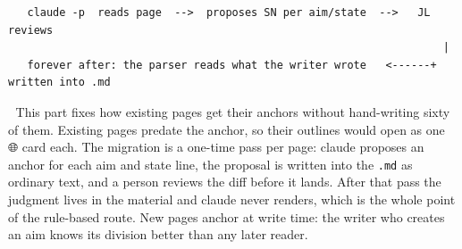 \begin{verbatim}
   claude -p  reads page  -->  proposes SN per aim/state  -->   JL reviews
                                                                    |
   forever after: the parser reads what the writer wrote   <------+ written into .md
\end{verbatim}
📌 This part fixes how existing pages get their anchors without hand-writing sixty of them. Existing pages predate the anchor, so their outlines would open as one 🌐 card each. The migration is a one-time pass per page: claude proposes an anchor for each aim and state line, the proposal is written into the \texttt{.md} as ordinary text, and a person reviews the diff before it lands. After that pass the judgment lives in the material and claude never renders, which is the whole point of the rule-based route. New pages anchor at write time: the writer who creates an aim knows its division better than any later reader.

